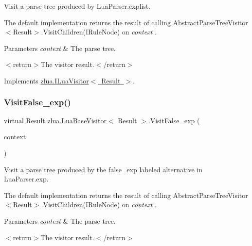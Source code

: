 Visit a parse tree produced by Lua\+Parser.\+explist. 

The default implementation returns the result of calling Abstract\+Parse\+Tree\+Visitor$<$\+Result$>$.\+Visit\+Children(\+I\+Rule\+Node) on {\itshape context} . 


\begin{DoxyParams}{Parameters}
{\em context} & The parse tree.\\
\hline
\end{DoxyParams}
$<$return$>$The visitor result.$<$/return$>$ 

Implements \mbox{\hyperlink{interfacezlua_1_1_i_lua_visitor_a6460b930bcd8c394def92c3cfb519d0e}{zlua.\+I\+Lua\+Visitor$<$ Result $>$}}.

\mbox{\label{classzlua_1_1_lua_base_visitor_a4c9fede80d7358d76c558891a1909ab3}} 
\subsubsection{\texorpdfstring{Visit\+False\+\_\+exp()}{VisitFalse\_exp()}}
{\footnotesize\ttfamily virtual Result \mbox{\hyperlink{classzlua_1_1_lua_base_visitor}{zlua.\+Lua\+Base\+Visitor}}$<$ Result $>$.Visit\+False\+\_\+exp (\begin{DoxyParamCaption}\item[{\mbox{[}\+Not\+Null\mbox{]} \mbox{\hyperlink{classzlua_1_1_lua_parser_1_1_false__exp_context}{Lua\+Parser.\+False\+\_\+exp\+Context}}}]{context }\end{DoxyParamCaption})\hspace{0.3cm}{\ttfamily [virtual]}}



Visit a parse tree produced by the {\ttfamily false\+\_\+exp} labeled alternative in Lua\+Parser.\+exp. 

The default implementation returns the result of calling Abstract\+Parse\+Tree\+Visitor$<$\+Result$>$.\+Visit\+Children(\+I\+Rule\+Node) on {\itshape context} . 


\begin{DoxyParams}{Parameters}
{\em context} & The parse tree.\\
\hline
\end{DoxyParams}
$<$return$>$The visitor result.$<$/return$>$ 


